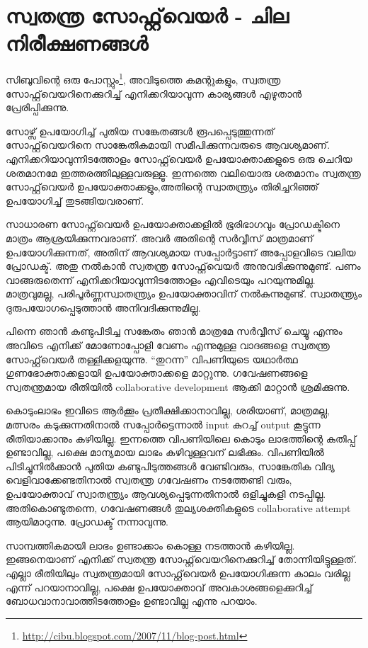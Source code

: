 \section*{സ്വതന്ത്ര സോഫ്റ്റ്‌വെയര്‍ - ചില നിരീക്ഷണങ്ങള്‍}
\vskip 2pt

സിബുവിന്റെ ഒരു പോസ്റ്റും\footnote{\url{http://cibu.blogspot.com/2007/11/blog-post.html}}, അവിടുത്തെ കമന്റുകളും, സ്വതന്ത്ര സോഫ്റ്റ്‌വെയറിനെക്കുറിച്ച് എനിക്കറിയാവുന്ന കാര്യങ്ങള്‍ എഴുതാന്‍ പ്രേരിപ്പിക്കുന്നു.

സോഴ്സ് ഉപയോഗിച്ച് പുതിയ സങ്കേതങ്ങള്‍ രൂപപ്പെടുത്തുന്നത് സോഫ്റ്റ്‌വെയറിനെ സാങ്കേതികമായി സമീപിക്കുന്നവരുടെ ആവശ്യമാണ്. എനിക്കറിയാവുന്നിടത്തോളം സോഫ്റ്റ്‌വെയര്‍ ഉപയോക്താക്കളുടെ ഒരു ചെറിയ ശതമാനമേ ഇത്തരത്തിലുള്ളവരുള്ളൂ. ഇന്നത്തെ വലിയൊരു ശതമാനം സ്വതന്ത്ര സോഫ്റ്റ്‌വെയര്‍ ഉപയോക്താക്കളും,അതിന്റെ സ്വാതന്ത്ര്യം തിരിച്ചറിഞ്ഞ് ഉപയോഗിച്ച് തുടങ്ങിയവരാണ്.

സാധാരണ സോഫ്റ്റ്‌വെയര്‍ ഉപയോക്താക്കളില്‍ ഭൂരിഭാഗവും പ്രോഡക്ടിനെ മാത്രം ആശ്രയിക്കുന്നവരാണ്. അവര്‍ അതിന്റെ സര്‍വ്വീസ് മാത്രമാണ് ഉപയോഗിക്കുന്നത്, അതിന് ആവശ്യമായ സപ്പോര്‍ട്ടാണ് അപ്പോളവിടെ വലിയ പ്രോഡക്ട്. അതു നല്‍കാന്‍ സ്വതന്ത്ര സോഫ്റ്റ്‌വെയര്‍ അനുവദിക്കുന്നുമുണ്ട്. പണം വാങ്ങരുതെന്ന് എനിക്കറിയാവുന്നിടത്തോളം എവിടെയും പറയുന്നുമില്ല. മാത്രവുമല്ല, പരിപൂര്‍ണ്ണസ്വാതന്ത്ര്യം ഉപയോക്താവിന് നല്‍കുന്നുമുണ്ട്. സ്വാതന്ത്ര്യം ദുരുപയോഗപ്പെടുത്താന്‍ അനിവദിക്കുന്നുമില്ല.

പിന്നെ ഞാന്‍ കണ്ടുപിടിച്ച സങ്കേതം ഞാന്‍ മാത്രമേ സര്‍വ്വീസ് ചെയ്യൂ എന്നും അവിടെ എനിക്ക് മോണോപ്പോളി വേണം എന്നുമുള്ള വാദങ്ങളെ സ്വതന്ത്ര സോഫ്റ്റ്‌വെയര്‍ തള്ളിക്കളയുന്നു. “തുറന്ന” വിപണിയുടെ യഥാര്‍ത്ഥ ഗുണഭോക്താക്കളായി ഉപയോക്താക്കളെ മാറ്റുന്നു. ഗവേഷണങ്ങളെ സ്വതന്ത്രമായ രീതിയില്‍ collaborative development ആക്കി മാറ്റാന്‍ ശ്രമിക്കുന്നു.

കൊടുംലാഭം ഇവിടെ ആര്‍ക്കൂം പ്രതീക്ഷിക്കാനാവില്ല, ശരിയാണ്, മാത്രമല്ല, മത്സരം കടുക്കുന്നതിനാല്‍ സപ്പോര്‍ട്ടെന്നാല്‍ input കുറച്ച് output കൂട്ടുന്ന രീതിയാക്കാനും കഴിയില്ല. ഇന്നത്തെ വിപണിയിലെ കൊടും ലാഭത്തിന്റെ കുതിപ്പ് ഉണ്ടാവില്ല, പക്ഷെ മാന്യമായ ലാഭം കഴിവുള്ളവന് ലഭിക്കും. വിപണിയില്‍ പിടിച്ചുനില്‍ക്കാന്‍ പുതിയ കണ്ടുപിടുത്തങ്ങള്‍ വേണ്ടിവരും, സാങ്കേതിക വിദ്യ വെളിവാക്കേണ്ടതിനാല്‍ സ്വതന്ത്ര ഗവേഷണം നടത്തേണ്ടി വരും, ഉപയോക്താവ് സ്വാതന്ത്ര്യം ആവശ്യപ്പെടുന്നതിനാല്‍ ഒളിച്ചുകളി നടപ്പില്ല. അതികൊണ്ടുതന്നെ, ഗവേഷണങ്ങള്‍ തുല്യശക്തികളുടെ collaborative attempt ആയിമാറുന്നു. പ്രോഡക്ട് നന്നാവുന്നു.

സാമ്പത്തികമായി ലാഭം ഉണ്ടാക്കാം കൊള്ള നടത്താന്‍ കഴിയില്ല. ഇങ്ങനെയാണ് എനിക്ക് സ്വതന്ത്ര സോഫ്റ്റ്‌വെയറിനെക്കുറിച്ച് തോന്നിയിട്ടുള്ളത്. എല്ലാ രീതിയിലും സ്വതന്ത്രമായി സോഫ്റ്റ്‌‌വെയര്‍ ഉപയോഗിക്കുന്ന കാലം വരില്ല എന്ന് പറയാനാവില്ല, പക്ഷെ ഉപയോക്താവ് അവകാശങ്ങളെക്കുറിച്ച് ബോധവാനാവാത്തിടത്തോളം ഉണ്ടാവില്ല എന്നു പറയാം.

